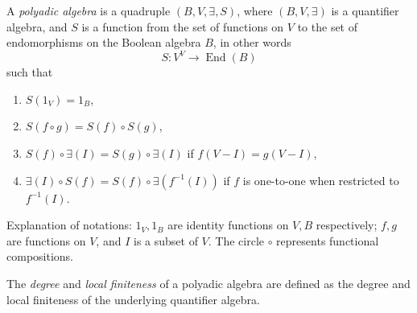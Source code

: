 \documentclass[12pt]{article}
\begin{document}
A \emph{polyadic algebra} is a quadruple $(B,V,\exists,S)$, where $(B,V,\exists)$ is a quantifier algebra, and $S$ is a function from the set of functions on $V$ to the set of endomorphisms on the Boolean algebra $B$, in other words $$S:V^V\to \operatorname{End}(B)$$ such that
\begin{enumerate}
\item $S(1_V)=1_B$,
\item $S(f\circ g)=S(f)\circ S(g)$,
\item $S(f)\circ \exists(I)=S(g)\circ \exists(I)$ if $f(V-I)=g(V-I)$,
\item $\exists(I)\circ S(f) = S(f)\circ \exists(f^{-1}(I))$ if $f$ is one-to-one when restricted to $f^{-1}(I)$.
\end{enumerate}

Explanation of notations: $1_V,1_B$ are identity functions on $V,B$ respectively; $f,g$ are functions on $V$, and $I$ is a subset of $V$.  The circle $\circ$ represents functional compositions.

The \emph{degree} and \emph{local finiteness} of a polyadic algebra are defined as the degree and local finiteness of the underlying quantifier algebra.
\end{document}
